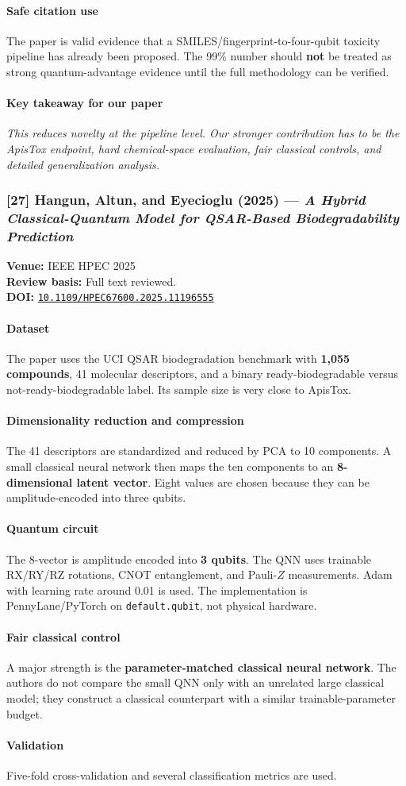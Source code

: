 \documentclass[11pt]{article}
\newcommand{\reviewfield}[2]{\paragraph{#1}#2}
\newcommand{\keytakeaway}[1]{\paragraph{Key takeaway for our paper}\emph{#1}}
\newcommand{\paperdoi}[1]{\href{https://doi.org/#1}{\texttt{#1}}}
\begin{document}
\reviewfield{Safe citation use}{
The paper is valid evidence that a SMILES/fingerprint-to-four-qubit toxicity pipeline has already been proposed. The 99\% number should \textbf{not} be treated as strong quantum-advantage evidence until the full methodology can be verified.
}

\keytakeaway{This reduces novelty at the pipeline level. Our stronger contribution has to be the ApisTox endpoint, hard chemical-space evaluation, fair classical controls, and detailed generalization analysis.}

\subsubsection{[27] Hangun, Altun, and Eyecioglu (2025) --- \textit{A Hybrid Classical-Quantum Model for QSAR-Based Biodegradability Prediction}}
\textbf{Venue:} IEEE HPEC 2025\\
\textbf{Review basis:} Full text reviewed.\\
\textbf{DOI:} \paperdoi{10.1109/HPEC67600.2025.11196555}

\reviewfield{Dataset}{
The paper uses the UCI QSAR biodegradation benchmark with \textbf{1,055 compounds}, 41 molecular descriptors, and a binary ready-biodegradable versus not-ready-biodegradable label. Its sample size is very close to ApisTox.
}

\reviewfield{Dimensionality reduction and compression}{
The 41 descriptors are standardized and reduced by PCA to 10 components. A small classical neural network then maps the ten components to an \textbf{8-dimensional latent vector}. Eight values are chosen because they can be amplitude-encoded into three qubits.
}

\reviewfield{Quantum circuit}{
The 8-vector is amplitude encoded into \textbf{3 qubits}. The QNN uses trainable RX/RY/RZ rotations, CNOT entanglement, and Pauli-$Z$ measurements. Adam with learning rate around 0.01 is used. The implementation is PennyLane/PyTorch on \texttt{default.qubit}, not physical hardware.
}

\reviewfield{Fair classical control}{
A major strength is the \textbf{parameter-matched classical neural network}. The authors do not compare the small QNN only with an unrelated large classical model; they construct a classical counterpart with a similar trainable-parameter budget.
}

\reviewfield{Validation}{
Five-fold cross-validation and several classification metrics are used.
}
\end{document}
